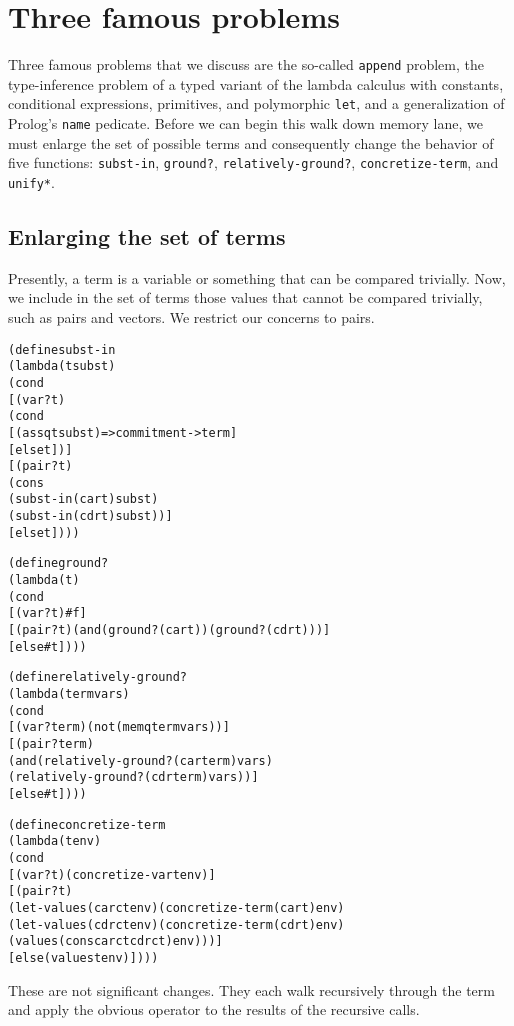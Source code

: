 \section{Three famous problems}

Three famous problems that we discuss are the so-called
\texttt{append} problem, the type-inference problem of a typed variant
of the lambda calculus with constants, conditional expressions,
primitives, and polymorphic \texttt{let}, and a generalization of
Prolog's \texttt{name} pedicate.  Before we can begin this walk down
memory lane, we must enlarge the set of possible terms and
consequently change the behavior of five functions: \texttt{subst-in},
\texttt{ground?}, \texttt{relatively-ground?},
\texttt{concretize-term}, and \texttt{unify*}.

\subsection{Enlarging the set of terms}

Presently, a term is a variable or something that can be compared
trivially.  Now, we include in the set of terms those values that
cannot be compared trivially, such as pairs and vectors.  We restrict
our concerns to pairs.

\begin{alltt}
(define subst-in
  (lambda (t subst)
    (cond
      [(var? t)
       (cond
         [(assq t subst) => commitment->term]
         [else t])]
      [(pair? t)
       (cons
         (subst-in (car t) subst)
         (subst-in (cdr t) subst))]
      [else t])))

(define ground?
  (lambda (t)
    (cond
      [(var? t) #f]
      [(pair? t) (and (ground? (car t)) (ground? (cdr t)))]
      [else #t])))

(define relatively-ground?
  (lambda (term vars)
    (cond
      [(var? term) (not (memq term vars))]
      [(pair? term)
       (and (relatively-ground? (car term) vars)
            (relatively-ground? (cdr term) vars))]
      [else #t])))

(define concretize-term
  (lambda (t env)
    (cond
      [(var? t) (concretize-var t env)]
      [(pair? t)
       (let-values (carct env) (concretize-term (car t) env)
         (let-values (cdrct env) (concretize-term (cdr t) env)
           (values (cons carct cdrct) env)))]
      [else (values t env)])))
\end{alltt}

These are not significant changes.  They each walk recursively
through the term and apply the obvious operator to the results of
the recursive calls.

